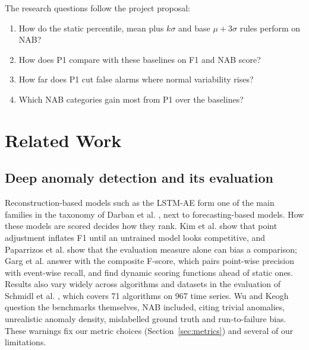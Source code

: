 \documentclass[conference]{IEEEtran}
\begin{document}
The research questions follow the project proposal:
\begin{enumerate}
\item[RQ1] How do the static percentile, mean plus $k\sigma$ and base $\mu + 3\sigma$ rules perform on NAB?
\item[RQ2] How does P1 compare with these baselines on F1 and NAB score?
\item[RQ3] How far does P1 cut false alarms where normal variability rises?
\item[RQ4] Which NAB categories gain most from P1 over the baselines?
\end{enumerate}

\section{Related Work}

\subsection{Deep anomaly detection and its evaluation}
Reconstruction-based models such as the LSTM-AE form one of the main families in the taxonomy of Darban et al. \cite{darban2024}, next to forecasting-based models. How these models are scored decides how they rank. Kim et al. \cite{kim2022} show that point adjustment inflates F1 until an untrained model looks competitive, and Paparrizos et al. \cite{paparrizos2022} show that the evaluation measure alone can bias a comparison; Garg et al. \cite{garg2022} answer with the composite F-score, which pairs point-wise precision with event-wise recall, and find dynamic scoring functions ahead of static ones. Results also vary widely across algorithms and datasets in the evaluation of Schmidl et al. \cite{schmidl2022}, which covers 71 algorithms on 967 time series. Wu and Keogh \cite{wu2023} question the benchmarks themselves, NAB included, citing trivial anomalies, unrealistic anomaly density, mislabelled ground truth and run-to-failure bias. These warnings fix our metric choices (Section~\ref{sec:metrics}) and several of our limitations.
\end{document}
